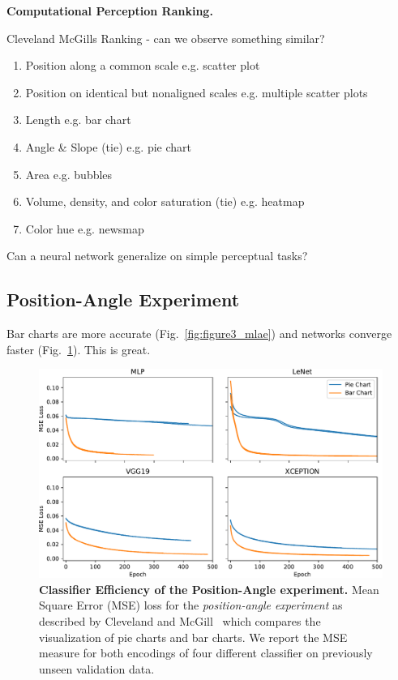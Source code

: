 \documentclass[journal]{vgtc}                %
\begin{document}
\textbf{Computational Perception Ranking.}

Cleveland McGills Ranking - can we observe something similar?

\begin{enumerate}
	\item Position along a common scale e.g. scatter plot
	\item Position on identical but nonaligned scales e.g. multiple scatter plots
	\item Length e.g. bar chart
	\item Angle \& Slope (tie) e.g. pie chart
	\item Area e.g. bubbles
	\item Volume, density, and color saturation (tie) e.g. heatmap
	\item Color hue e.g. newsmap
\end{enumerate}


Can a neural network generalize on simple perceptual tasks?

\subsection{Position-Angle Experiment}

Bar charts are more accurate (Fig.~\ref{fig:figure3_mlae}) and networks converge faster (Fig.~\ref{fig:figure3_val_loss}). This is great.

\begin{figure}[t]
	  \includegraphics[width=\linewidth]{figure3_val_loss.pdf}
  \caption{\textbf{Classifier Efficiency of the Position-Angle experiment.} Mean Square Error (MSE) loss for the \emph{position-angle experiment} as described by Cleveland and McGill~\cite{cleveland_mcgill} which compares the visualization of pie charts and bar charts. We report the MSE measure for both encodings of four different classifier on previously unseen validation data.}
	\label{fig:figure3_val_loss}
\end{figure}
\end{document}
